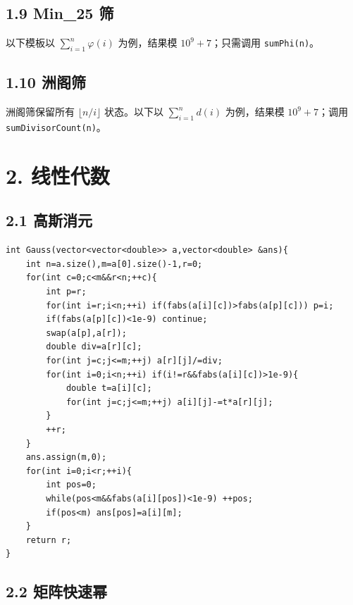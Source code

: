 \documentclass[UTF8,a4paper,11pt]{ctexart}
\begin{document}
\subsection*{1.9 Min\_25 筛}

以下模板以 $\sum_{i=1}^n\varphi(i)$ 为例，结果模 $10^9+7$；只需调用 \texttt{sumPhi(n)}。


\subsection*{1.10 洲阁筛}

洲阁筛保留所有 $\lfloor n/i\rfloor$ 状态。以下以 $\sum_{i=1}^n d(i)$ 为例，结果模 $10^9+7$；调用 \texttt{sumDivisorCount(n)}。



\section*{2. 线性代数}

\subsection*{2.1 高斯消元}

\begin{Verbatim}[fontsize=\small,frame=single,breaklines=true,breakanywhere=true]
int Gauss(vector<vector<double>> a,vector<double> &ans){
    int n=a.size(),m=a[0].size()-1,r=0;
    for(int c=0;c<m&&r<n;++c){
        int p=r;
        for(int i=r;i<n;++i) if(fabs(a[i][c])>fabs(a[p][c])) p=i;
        if(fabs(a[p][c])<1e-9) continue;
        swap(a[p],a[r]);
        double div=a[r][c];
        for(int j=c;j<=m;++j) a[r][j]/=div;
        for(int i=0;i<n;++i) if(i!=r&&fabs(a[i][c])>1e-9){
            double t=a[i][c];
            for(int j=c;j<=m;++j) a[i][j]-=t*a[r][j];
        }
        ++r;
    }
    ans.assign(m,0);
    for(int i=0;i<r;++i){
        int pos=0;
        while(pos<m&&fabs(a[i][pos])<1e-9) ++pos;
        if(pos<m) ans[pos]=a[i][m];
    }
    return r;
}
\end{Verbatim}

\subsection*{2.2 矩阵快速幂}
\end{document}
